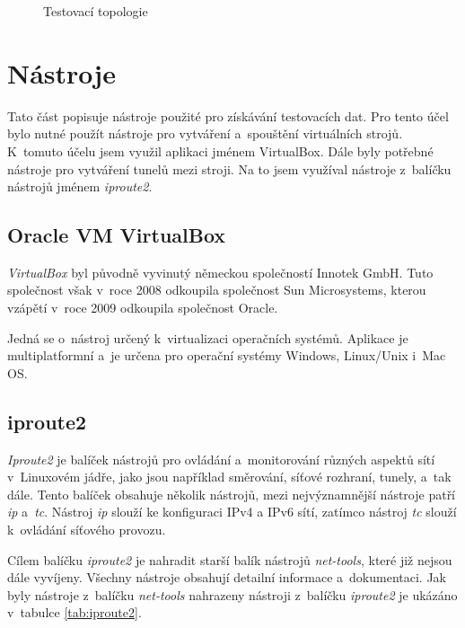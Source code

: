 \begin{figure}[H]
    \centering
    \caption{Testovací topologie}
    \label{img:topologie}
\end{figure}

\section{Nástroje}
\label{sec:nastroje}
Tato část popisuje nástroje použité pro získávání testovacích dat. Pro tento účel bylo nutné použít nástroje pro vytváření a~spouštění virtuálních strojů. K~tomuto účelu jsem využil aplikaci jménem VirtualBox. Dále byly potřebné nástroje pro vytváření tunelů mezi stroji. Na to jsem využíval nástroje z~balíčku nástrojů jménem \emph{iproute2}.

\subsection{Oracle VM VirtualBox}
\emph{VirtualBox} byl původně vyvinutý německou společností Innotek GmbH. Tuto společnost však v~roce 2008 odkoupila společnost Sun Microsystems, kterou vzápětí v~roce 2009 odkoupila společnost Oracle. 

Jedná se o~nástroj určený k~virtualizaci operačních systémů. Aplikace je multiplatformní a~je určena pro operační systémy Windows, Linux/Unix i~Mac OS.

\subsection{iproute2}
\emph{Iproute2} je balíček nástrojů pro ovládání a~monitorování různých aspektů sítí v~Linuxovém jádře, jako jsou například směrování, síťové rozhraní, tunely, a~tak dále. Tento balíček obsahuje několik nástrojů, mezi nejvýznamnější nástroje patří \emph{ip} a~\emph{tc}. Nástroj \emph{ip} slouží ke konfiguraci IPv4 a IPv6 sítí, zatímco nástroj \textit{tc} slouží k~ovládání síťového provozu.

Cílem balíčku \emph{iproute2} je nahradit starší balík nástrojů \emph{net-tools}, které již nejsou dále vyvíjeny. Všechny nástroje obsahují detailní informace a~dokumentaci. Jak byly nástroje z~balíčku \emph{net-tools} nahrazeny nástroji z~balíčku \emph{iproute2} je ukázáno v~tabulce \ref{tab:iproute2}.

